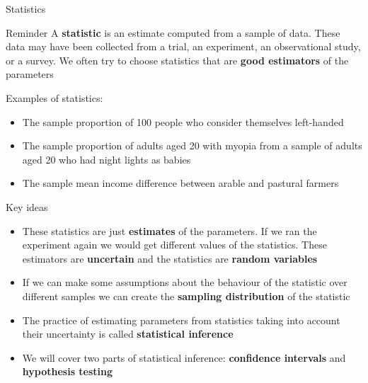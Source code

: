 \documentclass[12pt,xcolor=dvipsnames,handout,mathserif,aspectratio=169]{beamer}
\newcommand{\bbl}[1]{{\color{NavyBlue} \textbf{#1}}}
\newcommand{\bre}[1]{{\color{red} \textbf{#1}}}
\newcommand{\bgr}[1]{{\color{PineGreen} \textbf{#1}}}
\begin{document}
\begin{frame}{Statistics}

\begin{block}{Reminder}
A \bbl{statistic} is an estimate computed from a sample of data. These data may have been collected from a trial, an experiment, an observational study, or a survey. We often try to choose statistics that are \bgr{good estimators} of the parameters
\end{block}
\pause
Examples of statistics:
\begin{itemize}
\item The sample proportion of 100 people who consider themselves left-handed
\item The sample proportion of adults aged 20 with myopia from a sample of adults aged 20 who had night lights as babies
\item The sample mean income difference between arable and pastural farmers
\end{itemize}
\end{frame}

\begin{frame}{Key ideas}

\begin{block}{}
\begin{itemize}
\item These statistics are just \bre{estimates} of the parameters. If we ran the experiment again we would get different values of the statistics. These estimators are \bre{uncertain} and the statistics are \bbl{random variables}
\item If we can make some assumptions about the behaviour of the statistic over different samples we can create the \bgr{sampling distribution} of the statistic
\item The practice of estimating parameters from statistics taking into account their uncertainty is called \bbl{statistical inference}
\item We will cover two parts of statistical inference: \bgr{confidence intervals} and \bre{hypothesis testing}
\end{itemize}
\end{block}

\end{frame}
\end{document}
